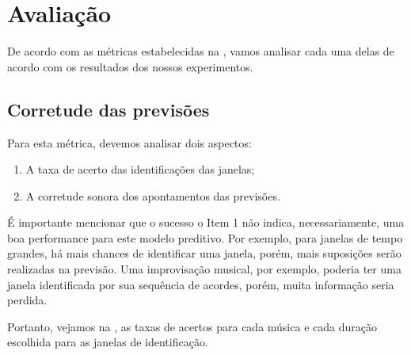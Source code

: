 \section{Avaliação}

De acordo com as métricas estabelecidas na , vamos analisar cada uma delas de acordo com os resultados dos nossos experimentos.

\subsection{Corretude das previsões}

Para esta métrica, devemos analisar dois aspectos:

\begin{enumerate}
    \item A taxa de acerto das identificações das janelas;
    \item A corretude sonora dos apontamentos das previsões.
\end{enumerate}

É importante mencionar que o sucesso o Item 1 não indica, necessariamente, uma boa performance para este modelo preditivo. Por exemplo, para janelas de tempo grandes, há mais chances de identificar uma janela, porém, mais suposições serão realizadas na previsão. Uma improvisação musical, por exemplo, poderia ter uma janela identificada por sua sequência de acordes, porém, muita informação seria perdida.

Portanto, vejamos na , as taxas de acertos para cada música e cada duração escolhida para as janelas de identificação.

\renewcommand{\arraystretch}{2}

